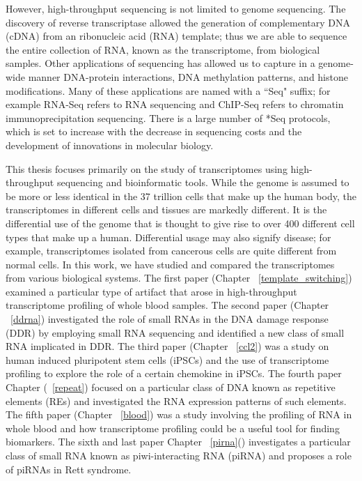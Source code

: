 However, high-throughput sequencing is not limited to genome sequencing. The discovery of reverse transcriptase\cite{pmid4316300, pmid4316301} allowed the generation of complementary DNA (cDNA) from an ribonucleic acid (RNA) template; thus we are able to sequence the entire collection of RNA, known as the transcriptome, from biological samples. Other applications of sequencing has allowed us to capture in a genome-wide manner DNA-protein interactions, DNA methylation patterns, and histone modifications\cite{applicationsofsequencing}. Many of these applications are named with a ``Seq" suffix; for example RNA-Seq refers to RNA sequencing and ChIP-Seq refers to chromatin immunoprecipitation sequencing. There is a large number of *Seq protocols\cite{pachter2014seq}, which is set to increase with the decrease in sequencing costs and the development of innovations in molecular biology.

This thesis focuses primarily on the study of transcriptomes using high-throughput sequencing and bioinformatic tools. While the genome is assumed to be more or less identical in the 37 trillion cells that make up the human body\cite{pmid23829164}, the transcriptomes in different cells and tissues are markedly different. It is the differential use of the genome that is thought to give rise to over 400 different cell types that make up a human\cite{pmid16790079}. Differential usage may also signify disease; for example, transcriptomes isolated from cancerous cells are quite different from normal cells. In this work, we have studied and compared the transcriptomes from various biological systems. The first paper (Chapter ~\ref{template_switching}) examined a particular type of artifact that arose in high-throughput transcriptome profiling of whole blood samples\cite{Tang01022013}. The second paper (Chapter ~\ref{ddrna}) investigated the role of small RNAs in the DNA damage response (DDR) by employing small RNA sequencing and identified a new class of small RNA implicated in DDR\cite{francia2012site}. The third paper (Chapter ~\ref{ccl2}) was a study on human induced pluripotent stem cells (iPSCs) and the use of transcriptome profiling to explore the role of a certain chemokine in iPSCs. The fourth paper Chapter (~\ref{repeat}) focused on a particular class of DNA known as repetitive elements (REs) and investigated the RNA expression patterns of such elements. The fifth paper (Chapter ~\ref{blood}) was a study involving the profiling of RNA in whole blood and how transcriptome profiling could be a useful tool for finding biomarkers. The sixth and last paper Chapter ~\ref{pirna}() investigates a particular class of small RNA known as piwi-interacting RNA (piRNA) and proposes a role of piRNAs in Rett syndrome.

